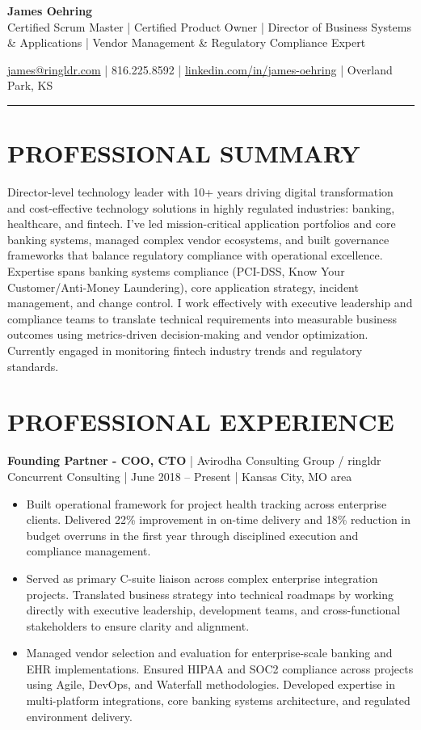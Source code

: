 \documentclass[10pt]{article}
\begin{document}
\noindent
{\Large\textbf{James Oehring}}\\
Certified Scrum Master | Certified Product Owner | Director of Business Systems \& Applications | Vendor Management \& Regulatory Compliance Expert

\noindent
\href{mailto:james@ringldr.com}{james@ringldr.com} | 816.225.8592 | \href{https://linkedin.com/in/james-oehring}{linkedin.com/in/james-oehring} | Overland Park, KS

\vspace{0.15in}
\noindent\rule{\textwidth}{0.5pt}

\section*{PROFESSIONAL SUMMARY}

Director-level technology leader with 10+ years driving digital transformation and cost-effective technology solutions in highly regulated industries: banking, healthcare, and fintech. I've led mission-critical application portfolios and core banking systems, managed complex vendor ecosystems, and built governance frameworks that balance regulatory compliance with operational excellence. Expertise spans banking systems compliance (PCI-DSS, Know Your Customer/Anti-Money Laundering), core application strategy, incident management, and change control. I work effectively with executive leadership and compliance teams to translate technical requirements into measurable business outcomes using metrics-driven decision-making and vendor optimization. Currently engaged in monitoring fintech industry trends and regulatory standards.

\section*{PROFESSIONAL EXPERIENCE}

\noindent
\textbf{Founding Partner - COO, CTO} | Avirodha Consulting Group / ringldr\\
Concurrent Consulting | June 2018 – Present | Kansas City, MO area
\begin{itemize}
  \setlength\itemsep{0.05in}
  \item Built operational framework for project health tracking across enterprise clients. Delivered 22\% improvement in on-time delivery and 18\% reduction in budget overruns in the first year through disciplined execution and compliance management.

  \item Served as primary C-suite liaison across complex enterprise integration projects. Translated business strategy into technical roadmaps by working directly with executive leadership, development teams, and cross-functional stakeholders to ensure clarity and alignment.

  \item Managed vendor selection and evaluation for enterprise-scale banking and EHR implementations. Ensured HIPAA and SOC2 compliance across projects using Agile, DevOps, and Waterfall methodologies. Developed expertise in multi-platform integrations, core banking systems architecture, and regulated environment delivery.
\end{itemize}
\end{document}
